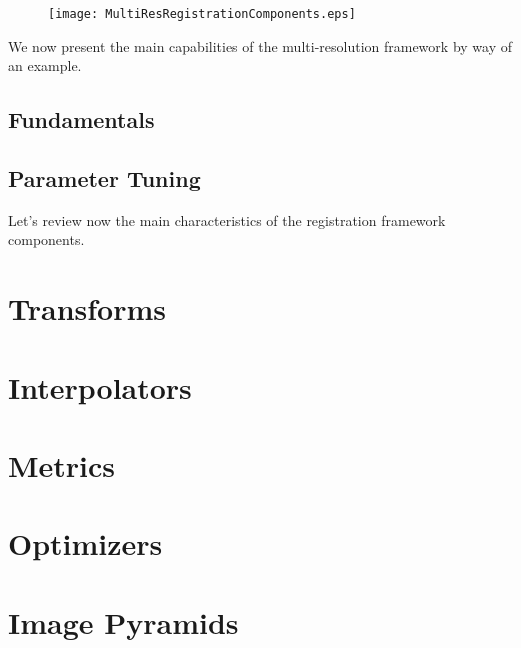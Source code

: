 \begin{figure}
\center
\texttt{[image: MultiResRegistrationComponents.eps]}
\label{fig:MultiResRegistrationComponents}
\end{figure}
 
We now present the main capabilities of the multi-resolution framework by
way of an example.

\subsection{Fundamentals}
\ifitkFullVersion

\fi

\subsection{Parameter Tuning}
\ifitkFullVersion

\fi

Let's review now the main characteristics of the registration framework components. 

\section{Transforms}
\label{sec:Transforms}
\ifitkFullVersion

\fi

\section{Interpolators}
\label{sec:Interpolators}
\ifitkFullVersion

\fi

\section{Metrics}
\label{sec:Metrics}
\ifitkFullVersion

\fi

\section{Optimizers}
\label{sec:Optimizers}
\ifitkFullVersion

\fi

\section{Image Pyramids}
\label{sec:ImagePyramids}
\ifitkFullVersion

\fi


